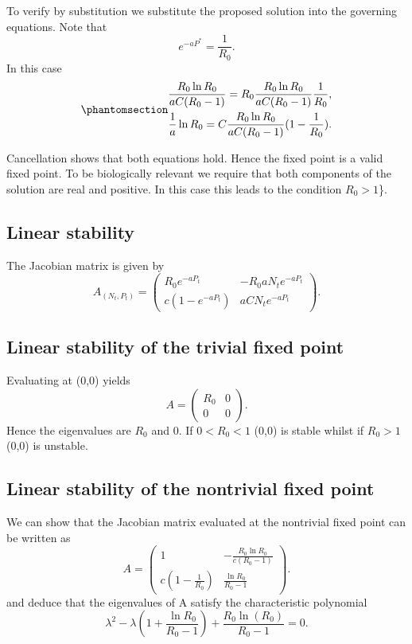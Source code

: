 \documentclass[
  letterpaper,
  DIV=11,
  numbers=noendperiod]{scrreprt}
\begin{document}
To verify by substitution we substitute the proposed solution into the
governing equations. Note that \[
e^{-aP^*}=\frac{1}{R_0}.
\] In this case
\begin{equation}\protect\phantomsection\label{eq-nichbail}{
\begin{aligned}
\frac{R_0\ln R_0 }{aC(R_0-1)}=R_0 \frac{R_0\ln R_0 }{aC(R_0-1)}\frac{1}{R_0}, \nonumber \\
\frac{1}{a} \ln R_0=C\frac{R_0\ln R_0 }{aC(R_0-1)} (1-\frac{1}{R_0}). 
\end{aligned}
}\end{equation}

Cancellation shows that both equations hold. Hence the fixed point is a
valid fixed point. To be biologically relevant we require that both
components of the solution are real and positive. In this case this
leads to the condition \(R_0>1\)\}.

\subsection{Linear stability}\label{linear-stability-2}

The Jacobian matrix is given by \[
A_{(N_t,P_t)}= \left(\begin{array}{cc}
R_0e^{-aP_t}&-R_0aN_te^{-aP_t} \\ c(1-e^{-aP_t})&aCN_te^{-aP_t} \end{array}\right).
\]

\subsection{Linear stability of the trivial fixed
point}\label{linear-stability-of-the-trivial-fixed-point}

Evaluating at (0,0) yields \[
A= \left(\begin{array}{cc}
R_0 & 0 \\ 0 & 0 \end{array}\right).
\] Hence the eigenvalues are \(R_0\) and 0. If \(0<R_0<1\) (0,0) is
stable whilst if \(R_0>1\) (0,0) is unstable.

\subsection{Linear stability of the nontrivial fixed
point}\label{linear-stability-of-the-nontrivial-fixed-point}

We can show that the Jacobian matrix evaluated at the nontrivial fixed
point can be written as \[
A= \left(\begin{array}{cc}
1&-\frac{R_0 \ln R_0}{c(R_0-1)} \\ c(1-\frac{1}{R_0})&\frac{\ln R_0}{R_0-1} \end{array}\right) .
\] and deduce that the eigenvalues of A satisfy the characteristic
polynomial \[
\lambda^2 - \lambda\left(1+\frac{\ln R_0}{R_0-1}\right)+ \frac{R_0\ln(R_0)}{R_0-1}=0.
\]
\end{document}
